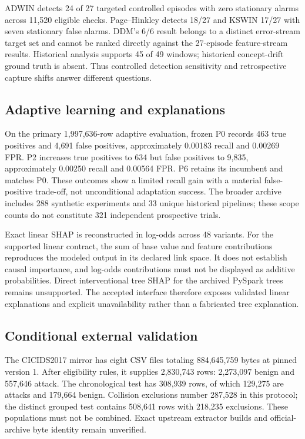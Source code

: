 \documentclass[conference]{IEEEtran}
\begin{document}
ADWIN detects 24 of 27 targeted controlled episodes with zero stationary alarms across 11,520 eligible checks. Page--Hinkley detects 18/27 and KSWIN 17/27 with seven stationary false alarms. DDM's 6/6 result belongs to a distinct error-stream target set and cannot be ranked directly against the 27-episode feature-stream results. Historical analysis supports 45 of 49 windows; historical concept-drift ground truth is absent. Thus controlled detection sensitivity and retrospective capture shifts answer different questions.

\subsection{Adaptive learning and explanations}
On the primary 1,997,636-row adaptive evaluation, frozen P0 records 463 true positives and 4,691 false positives, approximately 0.00183 recall and 0.00269 FPR. P2 increases true positives to 634 but false positives to 9,835, approximately 0.00250 recall and 0.00564 FPR. P6 retains its incumbent and matches P0. These outcomes show a limited recall gain with a material false-positive trade-off, not unconditional adaptation success. The broader archive includes 288 synthetic experiments and 33 unique historical pipelines; these scope counts do not constitute 321 independent prospective trials.

Exact linear SHAP is reconstructed in log-odds across 48 variants. For the supported linear contract, the sum of base value and feature contributions reproduces the modeled output in its declared link space. It does not establish causal importance, and log-odds contributions must not be displayed as additive probabilities. Direct interventional tree SHAP for the archived PySpark trees remains unsupported. The accepted interface therefore exposes validated linear explanations and explicit unavailability rather than a fabricated tree explanation.

\subsection{Conditional external validation}
The CICIDS2017 mirror has eight CSV files totaling 884,645,759 bytes at pinned version 1. After eligibility rules, it supplies 2,830,743 rows: 2,273,097 benign and 557,646 attack. The chronological test has 308,939 rows, of which 129,275 are attacks and 179,664 benign. Collision exclusions number 287,528 in this protocol; the distinct grouped test contains 508,641 rows with 218,235 exclusions. These populations must not be combined. Exact upstream extractor builds and official-archive byte identity remain unverified.
\end{document}
